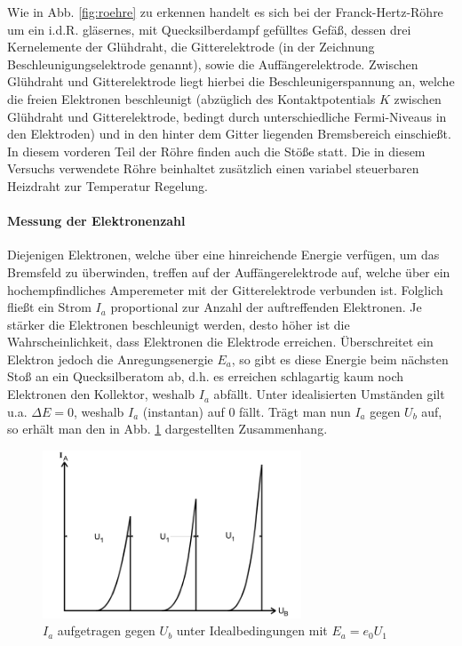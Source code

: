 Wie in Abb. \ref{fig:roehre} zu erkennen handelt es sich bei der Franck-Hertz-Röhre um ein i.d.R. gläsernes, mit Quecksilberdampf gefülltes Gefäß, dessen drei Kernelemente der Glühdraht, die Gitterelektrode (in der Zeichnung Beschleunigungselektrode genannt), sowie die Auffängerelektrode. Zwischen Glühdraht und Gitterelektrode liegt hierbei die Beschleunigerspannung an, welche die freien Elektronen beschleunigt (abzüglich des Kontaktpotentials $K$ zwischen Glühdraht und Gitterelektrode, bedingt durch unterschiedliche Fermi-Niveaus in den Elektroden) und in den hinter dem Gitter liegenden Bremsbereich einschießt. In diesem vorderen Teil der Röhre finden auch die Stöße statt. Die in diesem Versuchs verwendete Röhre beinhaltet zusätzlich einen variabel steuerbaren Heizdraht zur Temperatur Regelung.

\paragraph{Messung der Elektronenzahl}
Diejenigen Elektronen, welche über eine hinreichende Energie verfügen, um das Bremsfeld zu überwinden, treffen auf der Auffängerelektrode auf, welche über ein hochempfindliches Amperemeter mit der Gitterelektrode verbunden ist. Folglich fließt ein Strom $I_a$ proportional zur Anzahl der auftreffenden Elektronen. Je stärker die Elektronen beschleunigt werden, desto höher ist die Wahrscheinlichkeit, dass Elektronen die Elektrode erreichen. Überschreitet ein Elektron jedoch die Anregungsenergie $E_a$, so gibt es diese Energie beim nächsten Stoß an ein Quecksilberatom ab, d.h. es erreichen schlagartig kaum noch Elektronen den Kollektor, weshalb $I_a$ abfällt. Unter idealisierten Umständen gilt u.a. $\Delta E = 0$, weshalb $I_a$ (instantan) auf 0 fällt. Trägt man nun $I_a$ gegen $U_b$ auf, so erhält man den in Abb. \ref{fig:ideal} dargestellten Zusammenhang.

\begin{figure}
  \center
  \includegraphics[height = 5cm]{./logos/ideal.PNG}
  \caption{$I_a$ aufgetragen gegen $U_b$ unter Idealbedingungen mit $E_a = e_0 U_1$ \cite{Anleitung}}
  \label{fig:ideal}
\end{figure}
